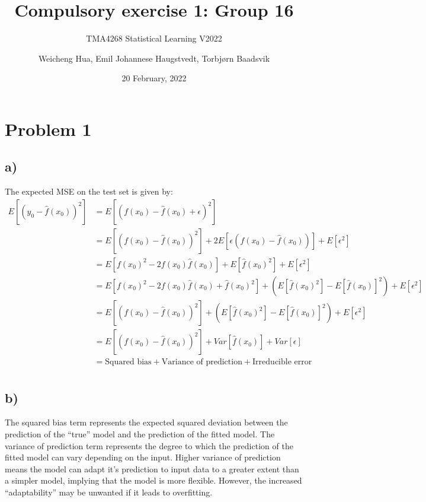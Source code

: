 \documentclass[
]{article}
\title{Compulsory exercise 1: Group 16}
\subtitle{TMA4268 Statistical Learning V2022}
\author{Weicheng Hua, Emil Johannese Haugstvedt, Torbjørn Baadsvik}
\date{20 February, 2022}
\begin{document}
\maketitle

\hypertarget{problem-1}{%
\section{Problem 1}\label{problem-1}}

\hypertarget{a}{%
\subsection{a)}\label{a}}

The expected MSE on the test set is given by: \[\begin{aligned}
  E[(y_0 - \hat{f}(x_0))^2] &= 
  E[(f(x_0) - \hat{f}(x_0) + \epsilon)^2] \\
  &= E[(f(x_0) - \hat{f}(x_0))^2] + 2E[\epsilon(f(x_0) - \hat{f}(x_0))] + E[\epsilon^2] \\
  &= E[f(x_0)^2 - 2f(x_0)\hat{f}(x_0)] + E[\hat{f}(x_0)^2] + E[\epsilon^2]\\
  &= E[f(x_0)^2 - 2f(x_0)\hat{f}(x_0) + \hat{f}(x_0)^2] 
  + ( E[\hat{f}(x_0)^2] - E[\hat{f}(x_0)]^2) + E[\epsilon^2] \\
  &= E[(f(x_0) - \hat{f}(x_0))^2] + ( E[\hat{f}(x_0)^2] - E[\hat{f}(x_0)]^2) + E[\epsilon^2]\\
  &= E[(f(x_0) - \hat{f}(x_0))^2] + Var[\hat{f}(x_0)] + Var[\epsilon]\\
  &= \text{Squared bias} + \text{Variance of prediction} + \text{Irreducible error}\\ 
\end{aligned}\]

\hypertarget{b}{%
\subsection{b)}\label{b}}

The squared bias term represents the expected squared deviation between
the prediction of the ``true'' model and the prediction of the fitted
model. The variance of prediction term represents the degree to which
the prediction of the fitted model can vary depending on the input.
Higher variance of prediction means the model can adapt it's prediction
to input data to a greater extent than a simpler model, implying that
the model is more flexible. However, the increased ``adaptability'' may
be unwanted if it leads to overfitting.
\end{document}
